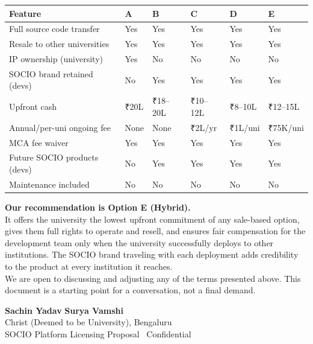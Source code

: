 \documentclass[12pt,a4paper]{article}
\begin{document}
\begin{tabularx}{\textwidth}{L{3.8cm} C{1.6cm} C{1.8cm} C{1.6cm} C{1.8cm} C{1.6cm}}
\toprule
{}
\textbf{Feature} & \textbf{A} & \textbf{B} & \textbf{C} & \textbf{D} & \textbf{E} \\
\midrule
Full source code transfer & Yes & Yes & Yes & Yes & Yes \\
Resale to other universities & Yes & Yes & Yes & Yes & Yes \\
IP ownership (university) & Yes & No & No & No & No \\
SOCIO brand retained (devs) & No & Yes & Yes & Yes & Yes \\
Upfront cash & ₹20L & ₹18–20L & ₹10–12L & ₹8–10L & ₹12–15L \\
Annual/per-uni ongoing fee & None & None & ₹2L/yr & ₹1L/uni & ₹75K/uni \\
MCA fee waiver & Yes & Yes & Yes & Yes & Yes \\
Future SOCIO products (devs) & No & Yes & Yes & Yes & Yes \\
Maintenance included & No & No & No & No & No \\
\bottomrule
\end{tabularx}

\vspace{0.8cm}

\begin{recommendbox}
\textbf{Our recommendation is Option E (Hybrid).}\\[0.3cm]
It offers the university the lowest upfront commitment of any sale-based option, gives them full rights to operate and resell, and ensures fair compensation for the development team only when the university successfully deploys to other institutions. The SOCIO brand traveling with each deployment adds credibility to the product at every institution it reaches.\\[0.3cm]
We are open to discussing and adjusting any of the terms presented above. This document is a starting point for a conversation, not a final demand.
\end{recommendbox}

\vspace{1.5cm}

\begin{center}
{\normalsize
\textbf{Sachin Yadav} \quad\textbullet\quad \textbf{Surya Vamshi}\\[0.2cm]
{\small Christ (Deemed to be University), Bengaluru}\\[0.4cm]
{\small\color{darkgray} SOCIO Platform Licensing Proposal \textbullet\ Confidential \textbullet\ \the\year}
}
\end{center}
\end{document}
